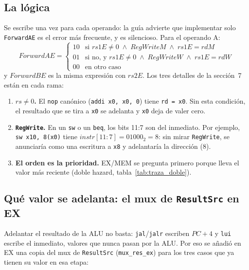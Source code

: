 \documentclass[11pt,letterpaper]{article}
\newcommand{\cod}[1]{\texttt{#1}}
\begin{document}
\subsection{La l\'ogica}
Se escribe una vez para cada operando: la gu\'ia advierte que implementar solo \cod{ForwardAE} es el
error m\'as frecuente, y es silencioso. Para el operando A:
\[
\mathit{ForwardAE} =
\begin{cases}
10 & \text{si } \mathit{rs1E}\neq 0 \;\wedge\; \mathit{RegWriteM} \;\wedge\; \mathit{rs1E} = \mathit{rdM}\\[2pt]
01 & \text{si no, y } \mathit{rs1E}\neq 0 \;\wedge\; \mathit{RegWriteW} \;\wedge\; \mathit{rs1E} = \mathit{rdW}\\[2pt]
00 & \text{en otro caso}
\end{cases}
\]
y $\mathit{ForwardBE}$ es la misma expresi\'on con $\mathit{rs2E}$. Los tres detalles de la
secci\'on~7 est\'an en cada rama:
\begin{enumerate}
\item \textbf{$\mathit{rs}\neq 0$.} El \cod{nop} can\'onico (\cod{addi x0, x0, 0}) tiene \cod{rd = x0}.
  Sin esta condici\'on, el resultado que se tira a \cod{x0} se adelanta y \cod{x0} deja de valer cero.
\item \textbf{\cod{RegWrite}.} En un \cod{sw} o un \cod{beq}, los bits 11:7 son del inmediato. Por
  ejemplo, \cod{sw x10, 8(x0)} tiene $\mathit{instr}[11{:}7] = 01000_2 = 8$: sin mirar \cod{RegWrite},
  se anunciar\'ia como una escritura a \cod{x8} y adelantar\'ia la direcci\'on (8).
\item \textbf{El orden es la prioridad.} EX/MEM se pregunta primero porque lleva el valor m\'as
  reciente (doble hazard, tabla~\ref{tab:traza_doble}).
\end{enumerate}

\subsection{Qu\'e valor se adelanta: el mux de \cod{ResultSrc} en EX}
Adelantar el resultado de la ALU no basta: \cod{jal}/\cod{jalr} escriben $PC+4$ y \cod{lui} escribe
el inmediato, valores que nunca pasan por la ALU. Por eso se a\~nadi\'o en EX una copia del mux de
\cod{ResultSrc} (\cod{mux\_res\_ex}) para los tres casos que ya tienen su valor en esa etapa:
\end{document}
